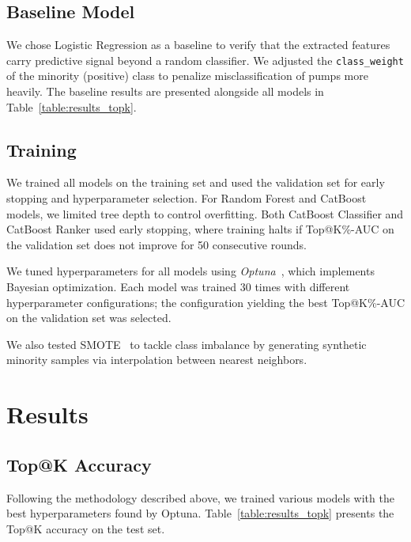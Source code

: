 \documentclass{ieeeaccess}
\begin{document}
\subsection{Baseline Model}

We chose Logistic Regression as a baseline to verify that the extracted features carry predictive signal beyond a random classifier. We adjusted the \texttt{class\_weight} of the minority (positive) class to penalize misclassification of pumps more heavily. The baseline results are presented alongside all models in Table~\ref{table:results_topk}.

\subsection{Training}
We trained all models on the training set and used the validation set for early stopping and hyperparameter selection. For Random Forest and CatBoost models, we limited tree depth to control overfitting. Both CatBoost Classifier and CatBoost Ranker used early stopping, where training halts if Top@K\%-AUC on the validation set does not improve for 50 consecutive rounds.

We tuned hyperparameters for all models using \textit{Optuna}~\cite{optuna_2019}, which implements Bayesian optimization. Each model was trained 30 times with different hyperparameter configurations; the configuration yielding the best Top@K\%-AUC on the validation set was selected.

We also tested SMOTE~\cite{chawla2002smote} to tackle class imbalance by generating synthetic minority samples via interpolation between nearest neighbors.


\section{Results}
\label{section:results}

\subsection{Top@K Accuracy}
Following the methodology described above, we trained various models with the best hyperparameters found by Optuna. Table~\ref{table:results_topk} presents the Top@K accuracy on the test set.
\end{document}
